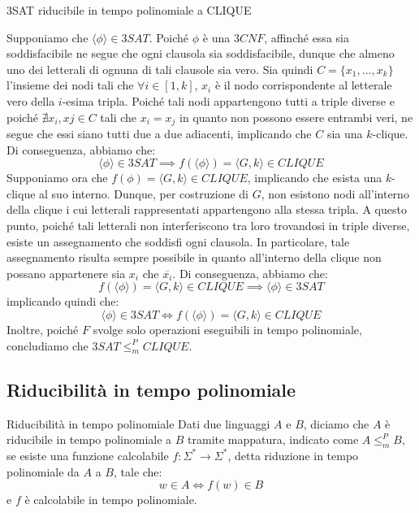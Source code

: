 \begin{Thm}{3SAT riducibile in tempo polinomiale a CLIQUE}{}
\begin{demonstration}
Supponiamo che $\langle\phi\rangle\in 3SAT$. Poiché $\phi$ è una $3CNF$, affinché essa sia soddisfacibile ne segue che ogni clausola sia soddisfacibile, dunque che almeno uno dei letterali di ognuna di tali clausole sia vero. Sia quindi $C = \{x_1, . . . , x_k\}$ l’insieme dei nodi tali che $\forall i\in [1, k]$, $x_i$ è il nodo corrispondente al letterale vero della $i$-esima tripla. Poiché tali nodi appartengono tutti a triple diverse e poiché $\nexists x_i, xj\in C$ tali che $x_i = x_j$ in quanto non possono essere entrambi veri, ne segue che essi siano tutti due a due adiacenti, implicando che $C$ sia una $k$-clique. Di conseguenza, abbiamo che:
\begin{equation*}
    \langle\phi\rangle\in 3SAT \implies f(\langle\phi\rangle) = \langle G, k\rangle \in CLIQUE
\end{equation*}
Supponiamo ora che $f(\phi) = \langle G, k\rangle \in CLIQUE$, implicando che esista una $k$-clique al suo interno. Dunque, per costruzione di $G$, non esistono nodi all’interno della
clique i cui letterali rappresentati appartengono alla stessa tripla. A questo punto, poiché tali letterali non interferiscono tra loro trovandosi in triple diverse, esiste un assegnamento che soddisfi ogni clausola. In particolare, tale assegnamento risulta sempre possibile in quanto all’interno della clique non possano appartenere sia $x_i$ che $\overline{x_i}$. Di conseguenza, abbiamo che:
\begin{equation*}
    f(\langle \phi\rangle) = \langle G, k\rangle \in CLIQUE \implies \langle \phi\rangle \in 3SAT   
\end{equation*}
implicando quindi che:
\begin{equation*}
    \langle \phi\rangle \in 3SAT \iff f(\langle \phi\rangle) = \langle G, k\rangle \in CLIQUE
\end{equation*}
Inoltre, poiché $F$ svolge solo operazioni eseguibili in tempo polinomiale, concludiamo
che $3SAT \leq^P_m CLIQUE$.
\end{demonstration}
\end{Thm}

\subsection{Riducibilità in tempo polinomiale}
\begin{Definition}{Riducibilità in tempo polinomiale}{}
Dati due linguaggi $A$ e $B$, diciamo che $A$ è riducibile in tempo polinomiale a $B$ tramite mappatura, indicato come $A \leq^P_m B$, se esiste una funzione calcolabile $f : \Sigma^*\to \Sigma^*$, detta riduzione in tempo polinomiale da $A$ a $B$, tale che:
\begin{equation*}
    w\in A\iff f(w)\in B
\end{equation*}
e $f$ è calcolabile in tempo polinomiale.
\end{Definition}

